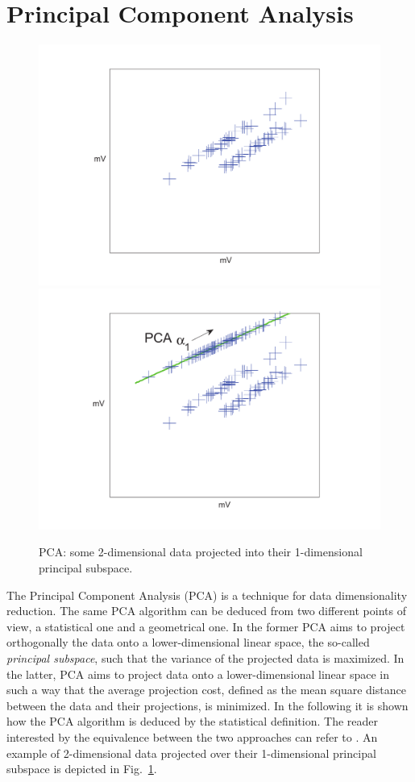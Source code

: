 
\section{Principal Component Analysis} \label{sec:PCA}
\begin{figure}
\includegraphics[width=.5\textwidth]{../Figures/PCA_LDA_geometric/PCA_unsupervised_mV2.pdf} 
\includegraphics[width=.5\textwidth]{../Figures/PCA_LDA_geometric/PCAprojection_unsupervised_mV2.pdf} 
\caption{PCA: some 2-dimensional data projected into their 1-dimensional principal subspace.}\label{fig:PCAunsupervised}
\end{figure}
The Principal Component Analysis (PCA) is a technique for data dimensionality reduction. The same PCA algorithm can be deduced from two different points of view, a statistical one and a geometrical one. In the former PCA aims to project orthogonally the data onto a lower-dimensional linear space, the so-called \emph{principal subspace}, such that the variance of the projected data is maximized. In the latter, PCA aims to project data onto a lower-dimensional linear space in such a way that the average projection cost, defined as the mean square distance between the data and their projections, is minimized. In the following it is shown how the PCA algorithm is deduced by the statistical definition. The reader interested by the equivalence between the two approaches can refer to \cite[Ch.\ 12]{christopher2006pattern}. An example of 2-dimensional data projected over their 1-dimensional principal subspace is depicted in Fig.~\ref{fig:PCAunsupervised}.\\

